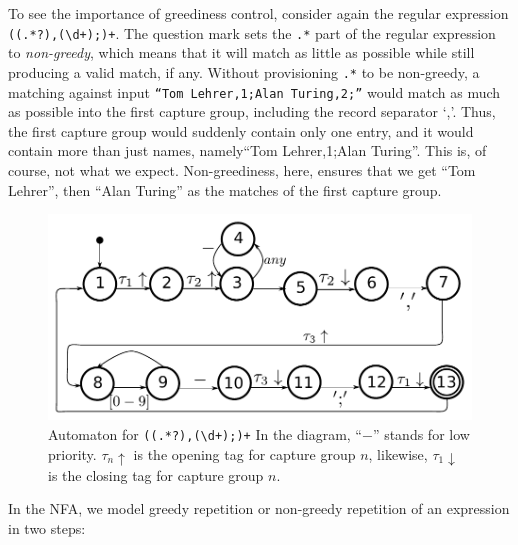 \documentclass[english]{sigplanconf}
\theoremstyle{definition}
\begin{document}
To see the importance of greediness control, consider again the regular
expression \texttt{((.*?),(\textbackslash{}d+);)+}. The question
mark sets the \texttt{.*} part of the regular expression to
\emph{non-greedy}, which means that it will match as little as
possible while still producing a valid match, if any.  Without
provisioning \texttt{.*} to be non-greedy, a matching against input
\texttt{``Tom Lehrer,1;Alan Turing,2;''} would match as much as
possible into the first capture group, including the record separator
`,'.  Thus, the first capture group would suddenly contain only one
entry, and it would contain more than just names, namely``Tom
Lehrer,1;Alan Turing''.  This is, of course, not what we expect.
Non-greediness, here, ensures that we get ``Tom Lehrer'', then
``Alan Turing'' as the matches of the first capture group.

\begin{figure}[h]
\includegraphics[width=\linewidth]{graphs/lehrer_automaton}

\caption{\label{fig:example-automaton}
Automaton for \texttt{((.*?),(\textbackslash{}d+);)+} 
In the diagram, ``$-$'' stands for low priority. $\tau_n\uparrow$ is the opening tag for capture group $n$, likewise, $\tau_1\downarrow$ is the closing tag for capture group $n$.}
\end{figure}


In the NFA, we model greedy repetition or non-greedy repetition of
an expression in two steps:
\end{document}

